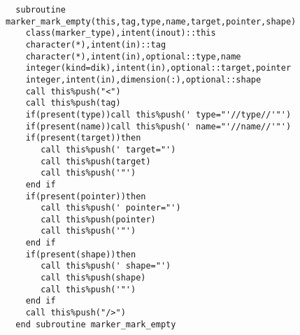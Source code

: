 \begin{Verbatim}
  subroutine marker_mark_empty(this,tag,type,name,target,pointer,shape)
    class(marker_type),intent(inout)::this
    character(*),intent(in)::tag
    character(*),intent(in),optional::type,name
    integer(kind=dik),intent(in),optional::target,pointer
    integer,intent(in),dimension(:),optional::shape
    call this%push("<")
    call this%push(tag)
    if(present(type))call this%push(' type="'//type//'"')
    if(present(name))call this%push(' name="'//name//'"')
    if(present(target))then
       call this%push(' target="')
       call this%push(target)
       call this%push('"')
    end if
    if(present(pointer))then
       call this%push(' pointer="')
       call this%push(pointer)
       call this%push('"')
    end if
    if(present(shape))then
       call this%push(' shape="')
       call this%push(shape)
       call this%push('"')
    end if
    call this%push("/>")
  end subroutine marker_mark_empty
\end{Verbatim}

